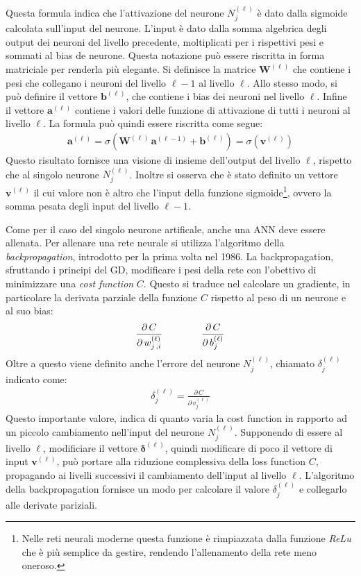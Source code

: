 \noindent Questa formula indica che l'attivazione del neurone $N^{(\ell)}_j$ è dato dalla sigmoide calcolata sull'input del neurone. L'input è dato dalla somma algebrica degli output dei neuroni del livello precedente, moltiplicati per i rispettivi pesi e sommati al bias de neurone. Questa notazione può essere riscritta in forma matriciale per renderla più elegante. Si definisce la matrice $\mathbf{W}^{(\ell)}$ che contiene i pesi che collegano i neuroni del livello $\ell-1$ al livello $\ell$. Allo stesso modo, si può definire il vettore $\mathbf{b}^{(\ell)}$, che contiene i bias dei neuroni nel livello $\ell$. Infine il vettore $\mathbf{a}^{(\ell)}$ contiene i valori delle funzione di attivazione di tutti i neuroni al livello $\ell$. La formula può quindi essere riscritta come segue:
% 
\begin{gather*}
    \mathbf{a}^{(\ell)} = \sigma\left( \mathbf{W}^{(\ell)}\, \mathbf{a}^{(\ell -1)} + \mathbf{b}^{(\ell)}\right) = \sigma\left( \mathbf{v}^{(\ell)}\right)
\end{gather*}
% 
\noindent Questo risultato fornisce una visione di insieme dell'output del livello $\ell$, rispetto che al singolo neurone $N^{(\ell)}_j$. Inoltre si osserva che è stato definito un vettore $\mathbf{v}^{(\ell)}$ il cui valore non è altro che l'input della funzione sigmoide\footnote{Nelle reti neurali moderne questa funzione è rimpiazzata dalla funzione \textsl{ReLu} che è più semplice da gestire, rendendo l'allenamento della rete meno oneroso.}, ovvero la somma pesata degli input del livello $\ell - 1$.

Come per il caso del singolo neurone artificale, anche una \acs{ANN} deve essere allenata. Per allenare una rete neurale si utilizza l'algoritmo della \textit{backpropagation}, introdotto per la prima volta nel 1986. La backpropagation, sfruttando i principi del \acs{GD}, modificare i pesi della rete con l'obettivo di minimizzare una \textsl{cost function} $C$. Questo si traduce nel calcolare un gradiente, in particolare la derivata parziale della funzione $C$ rispetto al peso di un neurone e al suo bias:
% 
\begin{gather*}
    \frac{\partial\,C}{\partial\,w^{(\ell)}_{j\,,i}}
    \hspace{40px}
    \frac{\partial\,C}{\partial\,b^{(\ell)}_j}
\end{gather*}
% 
\noindent Oltre a questo viene definito anche l'errore del neurone $N^{(\ell)}_j$, chiamato $\delta^{(\ell)}_j$ indicato come:
% 
\begin{gather*}
    \delta^{(\ell)}_j = \frac{\partial\,C}{\partial\,v^{(\ell)}_j}
\end{gather*}
% 
\noindent Questo importante valore, indica di quanto varia la cost function in rapporto ad un piccolo cambiamento nell'input del neurone $N^{(\ell)}_j$. Supponendo di essere al livello $\ell$, modificiare il vettore $\boldsymbol{\delta}^{(\ell)}$, quindi modificare di poco il vettore di input $\mathbf{v}^{(\ell)}$, può portare alla riduzione complessiva della loss function $C$, propagando ai livelli successivi il cambiamento dell'input al livello $\ell$. L'algoritmo della backpropagation fornisce un modo per calcolare il valore $\delta^{(\ell)}_j$ e collegarlo alle derivate pariziali.

